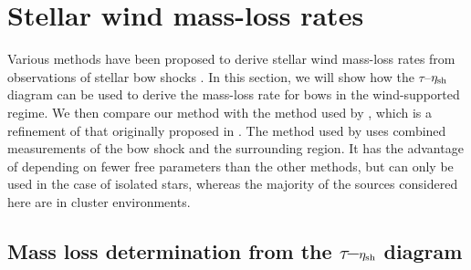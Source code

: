 \section{Stellar wind mass-loss rates}
\label{sec:stellar-wind-mass}

Various methods have been proposed to derive stellar wind mass-loss
rates from observations of stellar bow shocks \citetext{for example,
  \citealp{Kobulnicky:2010a, Gvaramadze:2012a, Kobulnicky:2018a}}.  In
this section, we will show how the \(\tau\)--\(\eta_{\text{sh}}\) diagram can be
used to derive the mass-loss rate for bows in the wind-supported
regime.  We then compare our method with the method used by
\citet{Kobulnicky:2018a}, which is a refinement of that originally
proposed in \citet{Kobulnicky:2010a}.  The method used by
\citet{Gvaramadze:2012a} uses combined measurements of the bow shock
and the surrounding \hii{} region.  It has the advantage of depending
on fewer free parameters than the other methods, but can only be used
in the case of isolated stars, whereas the majority of the sources
considered here are in cluster environments.

\subsection{Mass loss determination from the \boldmath \(\tau\)--\(\eta_{\text{sh}}\) diagram}
\label{sec:mass-loss-determ}

